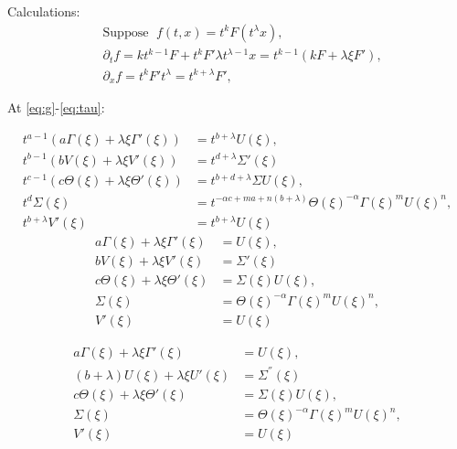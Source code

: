 \documentclass[a4paper,11pt]{article}
\begin{document}
Calculations:
\begin{align*}
 &\text{Suppose } \; f(t,x) = t^k F(t^\lambda x),\\
 &\partial_t f = k t^{k-1} F + t^k F' \lambda t^{\lambda-1} x = t^{k-1} (kF + \lambda\xi F'),\\
 &\partial_x f = t^k F' t^\lambda = t^{k+\lambda} F',
\end{align*}

At \eqref{eq:g}-\eqref{eq:tau}:

\begin{align*}
 t^{a-1}(a \Gamma(\xi) + \lambda \xi \Gamma'(\xi)) &= t^{b+ \lambda} U(\xi),\\
 t^{b-1}(b V(\xi) + \lambda \xi V'(\xi)) &= t^{d+ \lambda} \Sigma'(\xi)\\
 t^{c-1}(c \Theta(\xi) + \lambda \xi \Theta'(\xi))&=t^{b+d+\lambda} \Sigma U(\xi),\\
 t^d\Sigma(\xi) &= t^{-\alpha c +ma +n(b+ \lambda)} \Theta(\xi)^{-\alpha} \Gamma(\xi)^m U(\xi)^n,\\
 t^{b+\lambda}V'(\xi)&=t^{b+\lambda}U(\xi)
\end{align*}
\begin{equation}
\begin{aligned}
 a \Gamma(\xi) + \lambda \xi \Gamma'(\xi) &= U(\xi),\\
 b V(\xi) + \lambda \xi V'(\xi) &= \Sigma'(\xi)\\
 c \Theta(\xi) + \lambda \xi \Theta'(\xi)&=\Sigma(\xi) U(\xi),\\
 \Sigma(\xi) &= \Theta(\xi)^{-\alpha} \Gamma(\xi)^m U(\xi)^n,\\
 V'(\xi)&=U(\xi)
\end{aligned} \label{eq:ss-odes}
\end{equation}

\begin{equation}
\begin{aligned}
 a \Gamma(\xi) + \lambda \xi \Gamma'(\xi) &= U(\xi),\\
 (b+\lambda) U(\xi) + \lambda \xi U'(\xi) &= \Sigma^{''}(\xi)\\
 c \Theta(\xi) + \lambda \xi \Theta'(\xi)&=\Sigma(\xi) U(\xi),\\
 \Sigma(\xi) &= \Theta(\xi)^{-\alpha} \Gamma(\xi)^m U(\xi)^n,\\
 V'(\xi)&=U(\xi)
\end{aligned} \label{eq:ss-odes2}
\end{equation}
\end{document}

